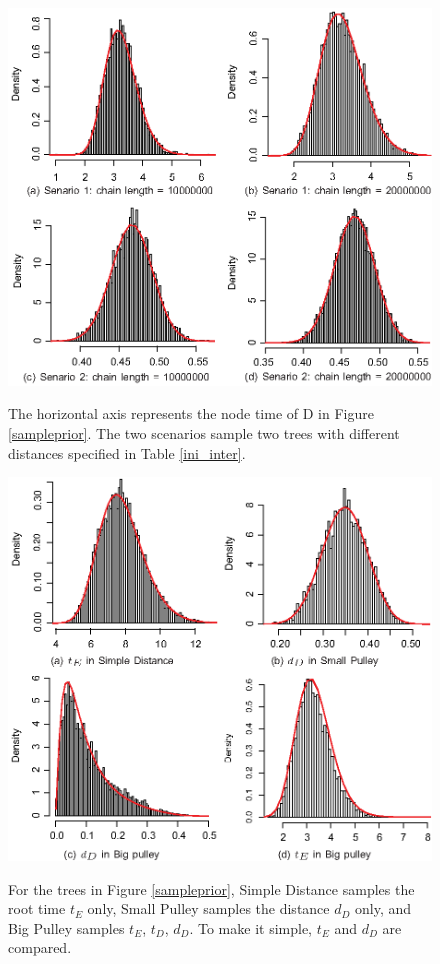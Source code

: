 \documentclass{bmcart}
\begin{document}
\begin{backmatter}
\begin{figure}[h!]
\includegraphics[width=12cm]{Fig09-testinternalnode.eps}\\
\caption{ 
             The horizontal axis represents the node time of D in Figure \ref{sampleprior}. The two scenarios sample two trees with different distances specified in Table \ref{ini_inter}.}
\label{res_int}
\end{figure}

\begin{figure}[h!]
\includegraphics[width=12cm]{Fig10-testroot.eps}\\
\caption{
             For the trees in Figure \ref{sampleprior}, Simple Distance samples the root time $t_E$ only, Small Pulley samples the distance $d_D$ only, and Big Pulley samples $t_E$, $t_D$, $d_D$. To make it simple, $t_E$ and $d_D$ are compared.}
\label{res_roo1}
\end{figure}


\end{backmatter}
\end{document}
